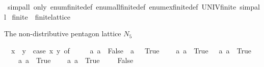 \begin{isabellebody}
\ {\isacharparenleft}{\kern0pt}simp{\isacharunderscore}{\kern0pt}all\ only{\isacharcolon}{\kern0pt}\ enum{\isacharunderscore}{\kern0pt}finite{\isacharunderscore}{\kern0pt}{}{\isacharunderscore}{\kern0pt}def\ enum{\isacharunderscore}{\kern0pt}all{\isacharunderscore}{\kern0pt}finite{\isacharunderscore}{\kern0pt}{}{\isacharunderscore}{\kern0pt}def\ enum{\isacharunderscore}{\kern0pt}ex{\isacharunderscore}{\kern0pt}finite{\isacharunderscore}{\kern0pt}{}{\isacharunderscore}{\kern0pt}def\ UNIV{\isacharunderscore}{\kern0pt}finite{\isacharunderscore}{\kern0pt}{}{\isacharcomma}{\kern0pt}\ simp{\isacharunderscore}{\kern0pt}all{\isacharparenright}{\kern0pt}%
\endisatagproof
{\isafoldproof}%
%
\isadelimproof
%
\endisadelimproof
\isanewline
\isanewline
{}\isamarkupfalse%
\isanewline
\isanewline
{}\isamarkupfalse%
\ finite{\isacharunderscore}{\kern0pt}{}\ {\isacharcolon}{\kern0pt}{\isacharcolon}{\kern0pt}\ finite{\isacharunderscore}{\kern0pt}lattice\isanewline
{}%
\begin{isamarkuptext}%
The non-distributive pentagon lattice $N_5$%
\end{isamarkuptext}\isamarkuptrue%
\isamarkupfalse%
\isanewline
\ \ {\isachardoublequoteopen}x\ {\isacharless}{\kern0pt}\ y\ {\isasymlongleftrightarrow}\ {\isacharparenleft}{\kern0pt}case\ {\isacharparenleft}{\kern0pt}x{\isacharcomma}{\kern0pt}\ y{\isacharparenright}{\kern0pt}\ of\isanewline
\ \ \ \ \ {\isacharparenleft}{\kern0pt}a\ a\ {\isasymRightarrow}\ False\ {\isacharbar}{\kern0pt}\ {\isacharparenleft}{\kern0pt}a\ {\isacharunderscore}{\kern0pt}{\isacharparenright}{\kern0pt}\ {\isasymRightarrow}\ True\isanewline
\ \ \ {\isacharbar}{\kern0pt}\ {\isacharparenleft}{\kern0pt}a\ a\ {\isasymRightarrow}\ True\ \ {\isacharbar}{\kern0pt}\ {\isacharparenleft}{\kern0pt}a\ a\ {\isasymRightarrow}\ True\isanewline
\ \ \ {\isacharbar}{\kern0pt}\ {\isacharparenleft}{\kern0pt}a\ a\ {\isasymRightarrow}\ True\isanewline
\ \ \ {\isacharbar}{\kern0pt}\ {\isacharparenleft}{\kern0pt}a\ a\ {\isasymRightarrow}\ True\ \ {\isacharbar}{\kern0pt}\ {\isacharunderscore}{\kern0pt}\ {\isasymRightarrow}\ False{\isacharparenright}{\kern0pt}{\isachardoublequoteclose}\isanewline

\end{isabellebody}
